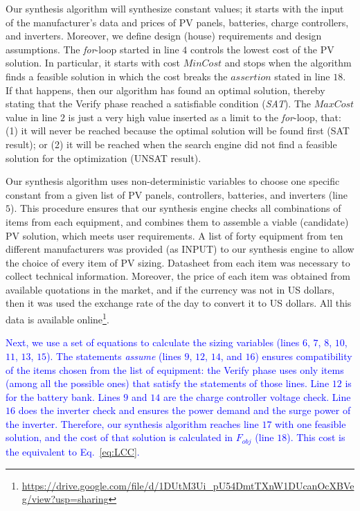 \documentclass[runningheads]{llncs}
\begin{document}
Our synthesis algorithm will synthesize constant values; 
it starts with the input of the manufacturer's data and prices of PV panels, batteries, charge controllers, and inverters. Moreover, we define design (house) requirements and design assumptions. 
%
The \textit{for}-loop started in line $4$ controls the lowest cost of the PV solution. In particular, it starts with cost $MinCost$ and stops when the algorithm finds a feasible solution in which the cost breaks the $assertion$ stated in line $18$. If that happens, then our algorithm has found an optimal solution, thereby stating that the {\sc Verify} phase reached a satisfiable condition (\textit{SAT}). The $MaxCost$ value in line $2$ is just a very high value inserted as a limit to the \textit{for}-loop, that: (1) it will never be reached because the optimal solution will be found first (SAT result); or (2) it will be reached when the search engine did not find a feasible solution for the optimization (UNSAT result).

Our synthesis algorithm uses non-deterministic variables to choose one specific constant from a given list of PV panels, controllers, batteries, and inverters (line $5$). This procedure ensures that our synthesis engine checks all combinations of items from each equipment, and combines them to assemble a viable (candidate) PV solution, which meets user requirements. A list of forty equipment from ten different manufacturers was provided (as INPUT) to our synthesis engine to allow the choice of every item of PV sizing. Datasheet from each item was necessary to collect technical information. Moreover, the price of each item was obtained from available quotations in the market, and if the currency was not in US dollars, then it was used the exchange rate of the day to convert it to US dollars. All this data is available online\footnote{\url{https://drive.google.com/file/d/1DUtM3Ui\_pU54DmtTXnW1DUcanOcXBVeg/view?usp=sharing}}.

\textcolor{blue}{Next, we use a set of equations to calculate the sizing variables (lines $6$, $7$, $8$, $10$, $11$, $13$, $15$). The statements \textit{assume} (lines $9$, $12$, $14$, and $16$) ensures compatibility of the items chosen from the list of equipment: the {\sc Verify} phase uses only items (among all the possible ones) that satisfy the statements of those lines. Line $12$ is for the battery bank. Lines $9$ and $14$ are the charge controller voltage check. Line $16$ does the inverter check and ensures the power demand and the surge power of the inverter. Therefore, our synthesis algorithm reaches line $17$ with one feasible solution, and the cost of that solution is calculated in $F_{obj}$ (line $18$). This cost is the equivalent to Eq.~\eqref{eq:LCC}.}
\end{document}
